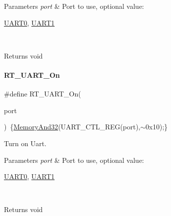\begin{DoxyParams}{Parameters}
{\em port} & Port to use, optional value\+:
\begin{DoxyCode}
\mbox{\hyperlink{a00173_a0508661f121639ffdee7de2353a0def2}{UART0}}, \mbox{\hyperlink{a00173_a8d69bf04d07af4fbbab5a8bd291f65ff}{UART1}}
\end{DoxyCode}
 \\
\hline
\end{DoxyParams}
\begin{DoxyReturn}{Returns}
void 
\end{DoxyReturn}
\mbox{\label{a00173_a7c1428a7b16eec7fe710679dd70b4069}} 
\paragraph{\texorpdfstring{R\+T\+\_\+\+U\+A\+R\+T\+\_\+\+On}{RT\_UART\_On}}
{\footnotesize\ttfamily \#define R\+T\+\_\+\+U\+A\+R\+T\+\_\+\+On(\begin{DoxyParamCaption}\item[{}]{port }\end{DoxyParamCaption})~\{\mbox{\hyperlink{a00068_ad87cedffcaadc51db22594fce55173d4}{Memory\+And32}}(U\+A\+R\+T\+\_\+\+C\+T\+L\+\_\+\+R\+EG(port),$\sim$0x10);\}}



Turn on Uart. 


\begin{DoxyParams}{Parameters}
{\em port} & Port to use, optional value\+:
\begin{DoxyCode}
\mbox{\hyperlink{a00173_a0508661f121639ffdee7de2353a0def2}{UART0}}, \mbox{\hyperlink{a00173_a8d69bf04d07af4fbbab5a8bd291f65ff}{UART1}}
\end{DoxyCode}
 \\
\hline
\end{DoxyParams}
\begin{DoxyReturn}{Returns}
void 
\end{DoxyReturn}
\mbox{\label{a00173_ad8934a303c429b70176995f2dd6ac67b}} 
